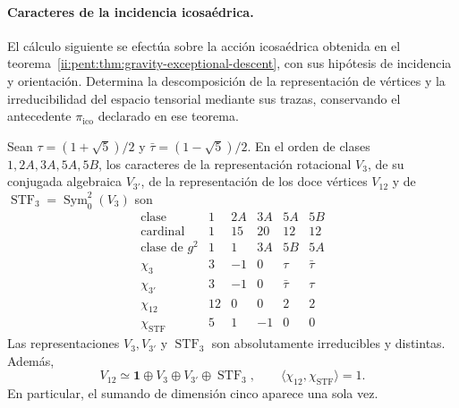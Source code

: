 \paragraph{Caracteres de la incidencia icosaédrica.}
El cálculo siguiente se efectúa sobre la acción icosaédrica obtenida en el
teorema~\ref{ii:pent:thm:gravity-exceptional-descent}, con sus hipótesis
de incidencia y orientación. Determina la descomposición de la
representación de vértices y la irreducibilidad del espacio tensorial
mediante sus trazas, conservando el antecedente
\(\pi_{\mathrm{ico}}\) declarado en ese teorema.

\begin{proposition}
\label{prop:ii-pent-caracteres}
Sean \(\tau=(1+\sqrt5)/2\) y
\(\bar\tau=(1-\sqrt5)/2\). En el orden de clases
\(1,2A,3A,5A,5B\), los caracteres de la representación rotacional
\(V_3\), de su conjugada algebraica \(V_{3'}\), de la representación
de los doce vértices \(V_{12}\) y de
\(\operatorname{STF}_3=\operatorname{Sym}^2_0(V_3)\) son
\begin{equation}
\label{eq:ii-pent-tabla-caracteres}
\begin{array}{c|rrrrr}
\text{clase} &1&2A&3A&5A&5B\\ \hline
\text{cardinal}&1&15&20&12&12\\
\text{clase de }g^2&1&1&3A&5B&5A\\ \hline
\chi_3&3&-1&0&\tau&\bar\tau\\
\chi_{3'}&3&-1&0&\bar\tau&\tau\\
\chi_{12}&12&0&0&2&2\\
\chi_{\mathrm{STF}}&5&1&-1&0&0
\end{array}
\end{equation}
Las representaciones \(V_3,V_{3'}\) y
\(\operatorname{STF}_3\) son absolutamente irreducibles y distintas.
Además,
\begin{equation}
\label{eq:ii-pent-descomposicion-demostrada}
 V_{12}\simeq\mathbf1\oplus V_3\oplus V_{3'}
                  \oplus\operatorname{STF}_3,
 \qquad
 \langle\chi_{12},\chi_{\mathrm{STF}}\rangle=1.
\end{equation}
En particular, el sumando de dimensión cinco aparece una sola vez.
\end{proposition}

